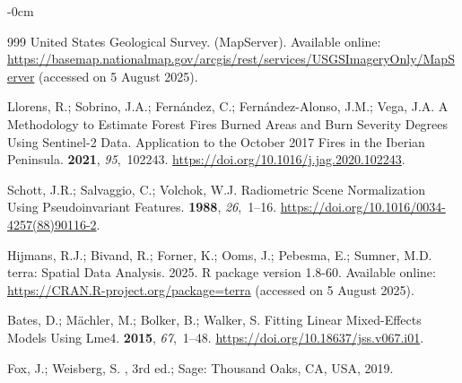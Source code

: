 \documentclass[fire,article,accept,oneauthor,pdftex]{Definitions/mdpi}
\begin{document}
\begin{adjustwidth}{-\extralength}{0cm}
\begin{thebibliography}{999}
{United States Geological Survey}.
 ({{MapServer}}).
\newblock
  Available online: \url{https://basemap.nationalmap.gov/arcgis/rest/services/USGSImageryOnly/MapServer} (accessed on 5 August 2025).

Llorens, R.; Sobrino, J.A.; Fern{\'a}ndez, C.; {Fern{\'a}ndez-Alonso}, J.M.;
  Vega, J.A.
\newblock A Methodology to Estimate Forest Fires Burned Areas and Burn Severity
  Degrees Using {{Sentinel-2}} Data. {{Application}} to the {{October}} 2017
  Fires in the {{Iberian Peninsula}}.
 {\bf 2021}, {\em 95},~102243.
\newblock
  \url{https://doi.org/10.1016/j.jag.2020.102243}.

Schott, J.R.; Salvaggio, C.; Volchok, W.J.
\newblock Radiometric Scene Normalization Using Pseudoinvariant Features.
 {\bf 1988}, {\em 26},~1--16.
\newblock
  \url{https://doi.org/10.1016/0034-4257(88)90116-2}.

Hijmans, R.J.; Bivand, R.; Forner, K.; Ooms, J.; Pebesma, E.; Sumner, M.D.
\newblock terra: Spatial Data Analysis.  2025.
\newblock R package version 1.8-60. 
\newblock Available online: \url{https://CRAN.R-project.org/package=terra} (accessed on 5 August 2025).


Bates, D.; M{\"a}chler, M.; Bolker, B.; Walker, S.
\newblock Fitting Linear Mixed-Effects Models Using Lme4.
 {\bf 2015}, {\em 67},~1--48.
\newblock
  \url{https://doi.org/10.18637/jss.v067.i01}.

Fox, J.; Weisberg, S.
, 3rd ed.; Sage: Thousand
  Oaks, CA,  USA, 2019.


\end{thebibliography}
\end{adjustwidth}
\end{document}
